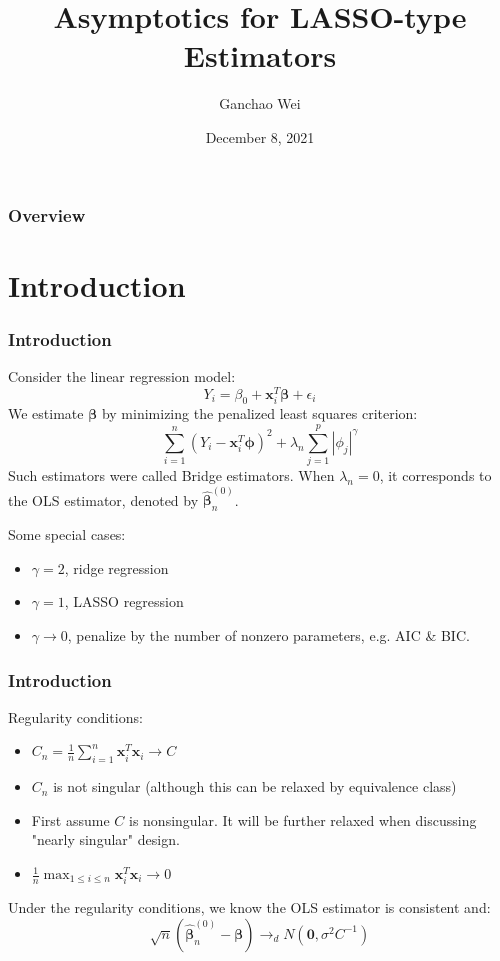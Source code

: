 \documentclass{beamer}
\title[Asymptotic LASSO]{Asymptotics for LASSO-type Estimators}
\author{Ganchao Wei}
\date{December 8, 2021}
\begin{document}
	
	\begin{frame}
		\titlepage %
	\end{frame}
	
	\begin{frame}
		\frametitle{Overview} %
		\tableofcontents
	\end{frame}
	
	
	\section{Introduction}
	
	\begin{frame}
		\frametitle{Introduction}
		Consider the linear regression model:
		$$Y_i = \beta_0 + \bm{x}_i^T\bm{\beta} + \epsilon_i$$
		We estimate $\bm{\beta}$ by minimizing the penalized least squares criterion:
		$$\sum_{i=1}^{n}(Y_i-\bm{x}_i^T\bm{\phi})^2 + \lambda_n\sum_{j=1}^{p}|\phi_j|^{\gamma}$$
		Such estimators were called Bridge estimators.
		When $\lambda_n = 0$, it corresponds to the OLS estimator, denoted by $\hat{\bm{\beta}}_n^{(0)}$.
		
		Some special cases:
		\begin{itemize}
			\item
			 $\gamma = 2$, ridge regression
			 \item
			 $\gamma = 1$, LASSO regression
			 \item
			 $\gamma \to 0$, penalize by the number of nonzero parameters, e.g. AIC \& BIC.
		\end{itemize}
	\end{frame}
	
	\begin{frame}
		\frametitle{Introduction}
		Regularity conditions:
		\begin{itemize}
			\item 
			$C_n = \frac{1}{n}\sum_{i=1}^{n}\bm{x}_i^T\bm{x}_i \to C$
			\item
			$C_n$ is not singular (although this can be relaxed by equivalence class)
			\item
			First assume $C$ is nonsingular. It will be further relaxed when discussing "nearly singular" design.
			\item
			$\frac{1}{n}\max_{1\leq i \leq n}\bm{x}_i^T\bm{x}_i \to 0$
		\end{itemize}
		 Under the regularity conditions, we know the OLS estimator is consistent and:
		$$\sqrt{n}(\hat{\bm{\beta}}_n^{(0)} - \bm{\beta}) \to_{d} N(\bm{0}, \sigma^2C^{-1})$$
	\end{frame}
	
\end{document}
